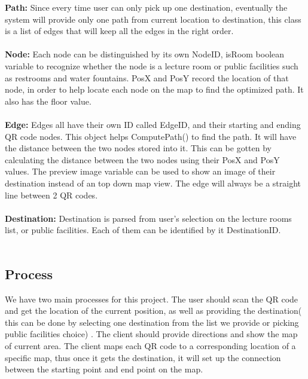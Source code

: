 \documentclass[12pt]{article}
\begin{document}
\textbf{Path:}	Since every time user can only pick up one destination, eventually the system will provide only one path from current location to destination, this class is a list of edges that will keep all the edges in the right order.  \\ \\

\textbf{Node:}
Each node can be distinguished by its own NodeID, isRoom boolean variable to recognize whether the node is a lecture room or public facilities such as restrooms and water fountains. PosX and PosY record the location of that node, in order to help locate each node on the map to find the optimized path. It also has the floor value.\\ \\
  
\textbf{Edge:}
Edges all have their own ID called EdgeID, and their starting and ending QR code nodes. This object helps ComputePath() to find the path. It will have the distance between the two nodes stored into it. This can be gotten by calculating the distance between the two nodes using their PosX and PosY values. The preview image variable can be used to show an image of their destination instead of an top down map view. The edge will always be a straight line between 2 QR codes.\\ \\

\textbf{Destination:}
Destination is parsed from user’s selection on the lecture rooms list, or public facilities. Each of them can be identified by it DestinationID.\\ \\



\newpage
\subsection{Process}
We have two main processes for this project. The user should scan the QR code and get the location of the current position, as well as providing the destination( this can be done by selecting one destination from the list we provide or picking public facilities choice)  . The client should provide directions and show the map of current area. The client maps each QR code to a corresponding location of a specific map, thus once it gets the destination, it will set up the connection between the starting point and end point on the map. 
\end{document}
